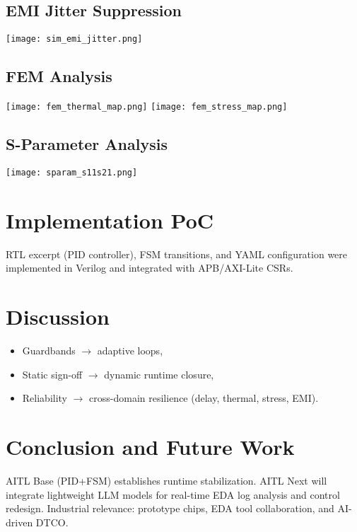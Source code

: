 \documentclass[conference]{IEEEtran}
\begin{document}
\subsection{EMI Jitter Suppression}
\texttt{[image: sim\_emi\_jitter.png]}

\subsection{FEM Analysis}
\texttt{[image: fem\_thermal\_map.png]}
\texttt{[image: fem\_stress\_map.png]}

\subsection{S-Parameter Analysis}
\texttt{[image: sparam\_s11s21.png]}

\section{Implementation PoC}
RTL excerpt (PID controller), FSM transitions, and YAML configuration were implemented in Verilog and integrated with APB/AXI-Lite CSRs.

\section{Discussion}
\begin{itemize}
  \item Guardbands $\to$ adaptive loops,
  \item Static sign-off $\to$ dynamic runtime closure,
  \item Reliability $\to$ cross-domain resilience (delay, thermal, stress, EMI).
\end{itemize}

\section{Conclusion and Future Work}
AITL Base (PID+FSM) establishes runtime stabilization.  
AITL Next will integrate lightweight LLM models for real-time EDA log analysis and control redesign.  
Industrial relevance: prototype chips, EDA tool collaboration, and AI-driven DTCO.



\end{document}
